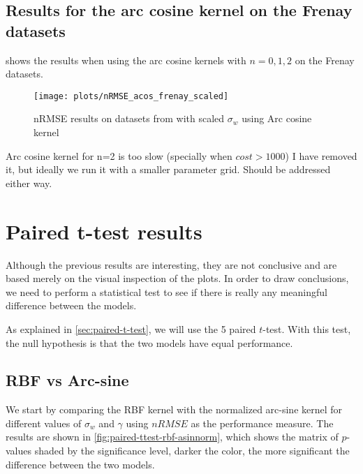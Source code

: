 \subsection{Results for the arc cosine kernel on the Frenay datasets}

 shows the results when using the arc cosine kernels
with $n=0,1,2$ on the Frenay datasets.

\begin{figure}[H]
    \texttt{[image: plots/nRMSE\_acos\_frenay\_scaled]}
    \caption{nRMSE results on datasets from \cite{frenayParameterinsensitiveKernelExtreme2011} with
        scaled $\sigma_w$ using Arc cosine kernel}%
    \label{fig:nrmse-acos-frenay-scaled}
\end{figure}

\begin{cnote}
    Arc cosine kernel for n=2 is too slow (specially when $cost>1000$)
    I have removed it, but ideally we run it with a smaller parameter grid.
    Should be addressed either way.
\end{cnote}

\section{Paired t-test results}

Although the previous results are interesting, they are not conclusive and
are based merely on the visual inspection of the plots. In order to draw
conclusions, we need to perform a statistical test to see if there is
really any meaningful difference between the models.

As explained in \cref{sec:paired-t-test}, we will use the 5
paired $t$-test. With this test, the null hypothesis is that the two models
have equal performance.

\subsection{RBF vs Arc-sine}

We start by comparing the RBF kernel with the normalized arc-sine kernel for
different values of $\sigma_w$ and $\gamma$ using $nRMSE$ as the performance
measure. The results are shown in \cref{fig:paired-ttest-rbf-asinnorm},
which shows the matrix of $p$-values shaded by the significance level,
darker the color, the more significant the difference between the two models.

